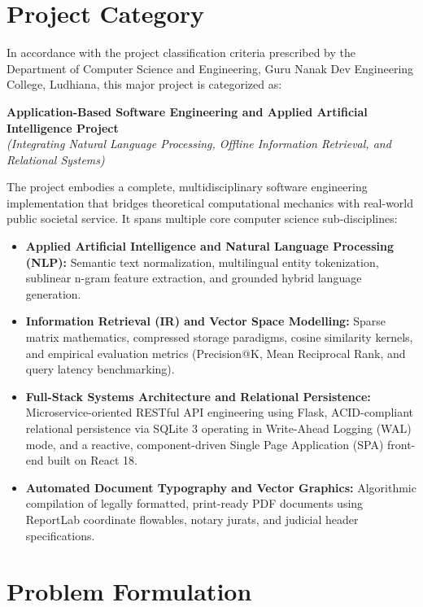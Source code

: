 \section{Project Category}
\label{sec:project_category}

In accordance with the project classification criteria prescribed by the Department of Computer Science and Engineering, Guru Nanak Dev Engineering College, Ludhiana, this major project is categorized as:

\begin{center}
    \textbf{Application-Based Software Engineering and Applied Artificial Intelligence Project} \\
    \textit{(Integrating Natural Language Processing, Offline Information Retrieval, and Relational Systems)}
\end{center}

The project embodies a complete, multidisciplinary software engineering implementation that bridges theoretical computational mechanics with real-world public societal service. It spans multiple core computer science sub-disciplines:
\begin{itemize}
    \item \textbf{Applied Artificial Intelligence and Natural Language Processing (NLP):} Semantic text normalization, multilingual entity tokenization, sublinear n-gram feature extraction, and grounded hybrid language generation.
    \item \textbf{Information Retrieval (IR) and Vector Space Modelling:} Sparse matrix mathematics, compressed storage paradigms, cosine similarity kernels, and empirical evaluation metrics (Precision@K, Mean Reciprocal Rank, and query latency benchmarking).
    \item \textbf{Full-Stack Systems Architecture and Relational Persistence:} Microservice-oriented RESTful API engineering using Flask, ACID-compliant relational persistence via SQLite 3 operating in Write-Ahead Logging (WAL) mode, and a reactive, component-driven Single Page Application (SPA) front-end built on React 18.
    \item \textbf{Automated Document Typography and Vector Graphics:} Algorithmic compilation of legally formatted, print-ready PDF documents using ReportLab coordinate flowables, notary jurats, and judicial header specifications.
\end{itemize}

\section{Problem Formulation}
\label{sec:problem_formulation}

